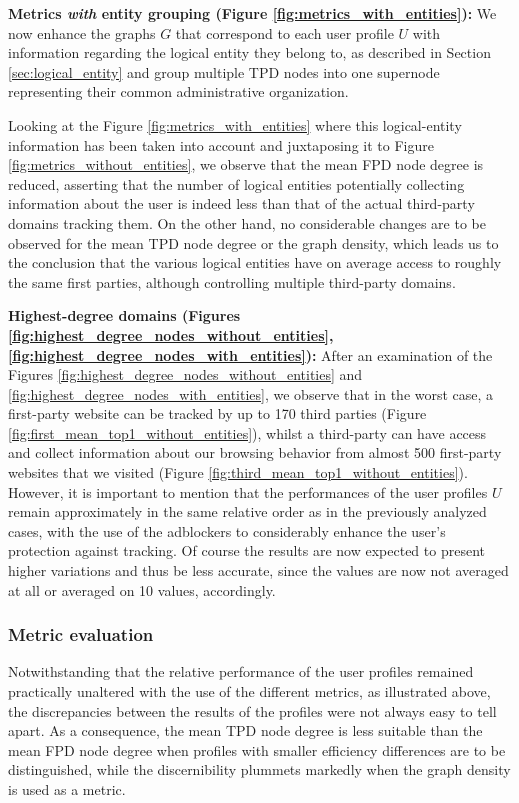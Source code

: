 \documentclass{sig-alternate}
\begin{document}
{\textbf{Metrics \textit{with} entity grouping (Figure \ref{fig:metrics_with_entities}):} We now enhance the graphs $G$ that correspond to each user profile $U$ with information regarding the logical entity they belong to, as described in Section \ref{sec:logical_entity} and group multiple TPD nodes into one supernode representing their common administrative organization.

Looking at the Figure \ref{fig:metrics_with_entities} where this logical-entity information has been taken into account and juxtaposing it to Figure \ref{fig:metrics_without_entities}, we observe that the mean FPD node degree is reduced, asserting that the number of logical entities potentially collecting information about the user is indeed less than that of the actual third-party domains tracking them. On the other hand, no considerable changes are to be observed for the mean TPD node degree or the graph density, which leads us to the conclusion that the various logical entities have on average access to roughly the same first parties, although controlling multiple third-party domains.

\textbf{Highest-degree domains (Figures \ref{fig:highest_degree_nodes_without_entities}, \ref{fig:highest_degree_nodes_with_entities}):} After an examination of the Figures \ref{fig:highest_degree_nodes_without_entities} and \ref{fig:highest_degree_nodes_with_entities}, we observe that in the worst case, a first-party website can be tracked by up to 170 third parties (Figure \ref{fig:first_mean_top1_without_entities}), whilst a third-party can have access and collect information about our browsing behavior from almost 500 first-party websites that we visited (Figure \ref{fig:third_mean_top1_without_entities}). However, it is important to mention that the performances of the user profiles $U$ remain approximately in the same relative order as in the previously analyzed cases, with the use of the adblockers to considerably enhance the user's protection against tracking. Of course the results are now expected to present higher variations and thus be less accurate, since the values are now not averaged at all or averaged on 10 values, accordingly.

\subsubsection{Metric evaluation}
Notwithstanding that the relative performance of the user profiles remained practically unaltered with the use of the different metrics, as illustrated above, the discrepancies between the results of the profiles were not always easy to tell apart. As a consequence, the mean TPD node degree is less suitable than the mean FPD node degree when profiles with smaller efficiency differences are to be distinguished, while the discernibility plummets markedly when the graph density is used as a metric.
}
\end{document}
